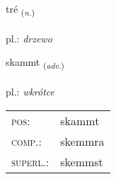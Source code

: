 \documentclass[frontgrid, backgrid]{flacards}\usepackage[]{graphicx}\usepackage[]{xcolor}
\begin{document}
\renewcommand{\flhead}{\vskip5pt \fboxsep=0pt {\small\bfseries\footnotesize Nafnorð | Noun}}
\renewcommand{\fcfoot}{\vskip5pt \fboxsep=0pt \hspace{2pt}{\small\bfseries\footnotesize 2K}}

\renewcommand{\blhead}{\vskip5pt {\small\bfseries\footnotesize Nafnorð | Noun }}
\renewcommand{\bcfoot}{\vskip5pt \hspace{2pt}{\small\bfseries\footnotesize 2K}}


{tré \small{\textsubscript{(\textit{n.})}} \\[1ex] %
\textphonetic{[tʰrjɛː]} \\
pl.: \emph{drzewo} \\  [2ex]
\renewcommand*{\arraystretch}{0.8}
}

\renewcommand{\flhead}{\vskip5pt \fboxsep=0pt {\small\bfseries\footnotesize Atviksorð | Adverb}}
\renewcommand{\fcfoot}{\vskip5pt \fboxsep=0pt \hspace{2pt}{\small\bfseries\footnotesize 2K}}

\renewcommand{\blhead}{\vskip5pt {\small\bfseries\footnotesize Atviksorð | Adverb }}
\renewcommand{\bcfoot}{\vskip5pt \hspace{2pt}{\small\bfseries\footnotesize 2K}}


{skammt \small{\textsubscript{(\textit{adv.})}} \\[1ex] %
\textphonetic{[skam̥t]} \\
pl.: \emph{wkrótce} \\  [2ex]
\renewcommand*{\arraystretch}{0.8}
\begin{tabular}{ll}
\textsc{pos}: & skammt \\ 
\textsc{comp.}: & skemmra \\ 
\textsc{superl.}: & skemmst \\
\end{tabular}
}
\end{document}
